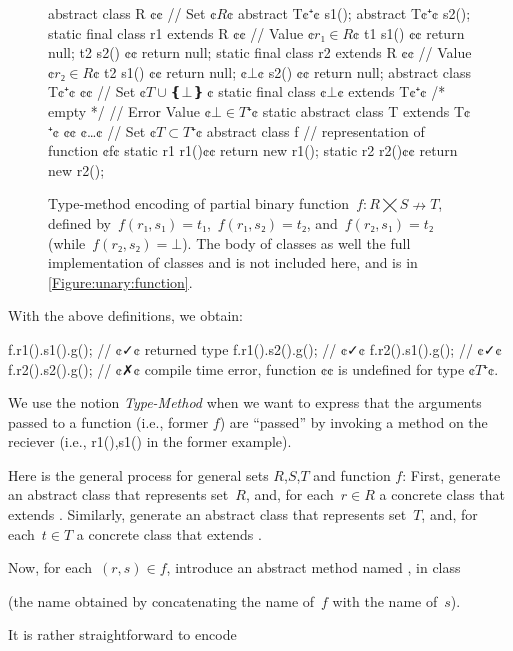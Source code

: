 \begin{figure}
  \begin{JAVA}[style=numbered]
abstract class R {¢¢ // Set ¢$R$¢
  abstract T¢$⁺$¢ s1();
  abstract T¢$⁺$¢ s2();
  static final class r1 extends R {¢¢ // Value ¢$r₁∈R$¢
    t1 s1() {¢¢ return null; }
    t2 s2() {¢¢ return null; }
  }
  static final class r2 extends R {¢¢ // Value ¢$r₂∈R$¢
    t2 s1() {¢¢ return null; }
    ¢$⊥$¢ s2() {¢¢ return null; }
  }
}
abstract class T¢$⁺$¢ {¢¢ // Set ¢$T∪❴⊥❵~$¢
  static final class ¢$⊥$¢ extends T¢$⁺$¢ { /* empty */ } // Error Value ¢$⊥∈T⁺$¢
  static abstract class T extends T¢$⁺$¢ {¢¢ ¢…¢ } // Set ¢$T⊂T⁺$¢
}
abstract class f{ // representation of function ¢f¢
  static r1 r1(){¢¢ return new r1(); }
  static r2 r2(){¢¢ return new r2(); }
}
\end{JAVA}
  \caption{Type-method encoding of partial binary function~$f: R⨉S↛T$,
  defined by~$f(r₁,s₁)=t₁$,~$f(r₁,s₂)=t₂$, and~$f(r₂,s₁)=t₂$ (while~$f(r₂, s₂) =⊥$).
  The body of classes  as well the full implementation of classes  and  is not included here, and is
    in \cref{Figure:unary:function}.}
  \label{Figure:simple:binary}
\end{figure}

With the above definitions, we obtain:
\begin{JAVA}
f.r1().s1().g(); // ¢✓¢ returned type
f.r1().s2().g(); // ¢✓¢
f.r2().s1().g(); // ¢✓¢
f.r2().s2().g(); // ¢✗¢ compile time error, function ¢¢ is undefined for type ¢$T⁺$¢.
\end{JAVA}
We use the notion \emph{Type-Method} when we want to express that the arguments passed to a function 
  (i.e., former $f$) are ``passed'' by invoking a method on the reciever (i.e., r1(),s1() in the former example).

Here is the general process for general sets $R$,$S$,$T$ and function $f$:
First, generate an abstract class  that represents set~$R$, and,
  for each~$r∈R$ a concrete class  that extends .
Similarly, generate an abstract class  that represents set~$T$, and,
  for each~$t∈T$ a concrete class  that extends .

Now, for each~$(r,s)∈f$, introduce an abstract method named ,
  in class~

(the name obtained by
  concatenating the name of~$f$ with the name of~$s$).

It is rather straightforward to encode
